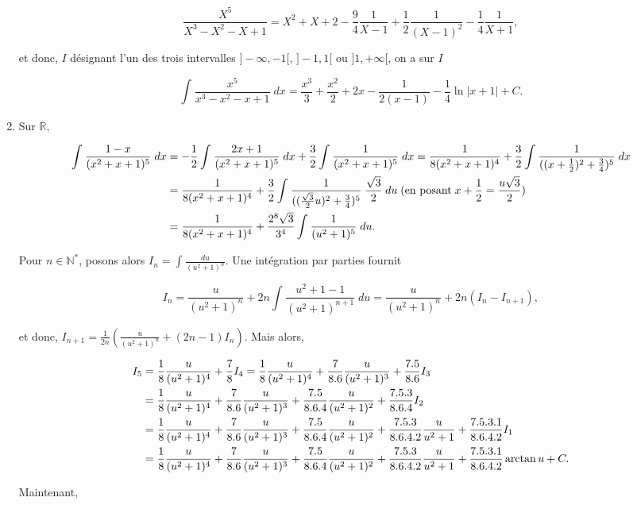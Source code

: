\documentclass[11pt,a4paper]{article}
\newcommand{\Nn}{\mathbb{N}} \newcommand{\N}{\mathbb{N}}
\newcommand{\Rr}{\mathbb{R}} \newcommand{\R}{\mathbb{R}}
\newcommand{\Arctan}{\mathop{\mathrm{arctan}}\nolimits}
\begin{document}
\begin{enumerate}
$$\frac{X^5}{X^3-X^2-X+1}=X^2+X+2-\frac{9}{4}\frac{1}{X-1}+\frac{1}{2}\frac{1}{(X-1)^2}-\frac{1}{4}\frac{1}{X+1},$$

et donc, $I$ désignant l'un des trois intervalles $]-\infty,-1[$, $]-1,1[$ ou $]1,+\infty[$, on a sur $I$

$$\int_{}^{}\frac{x^5}{x^3-x^2-x+1}\;dx=\frac{x^3}{3}+\frac{x^2}{2}+2x-\frac{1}{2(x-1)}-\frac{1}{4}\ln|x+1|+C.$$
\item  Sur $\Rr$,

\begin{align*}\ensuremath
\int_{}^{}\frac{1-x}{(x^2+x+1)^5}\;dx&=-\frac{1}{2}\int_{}^{}\frac{2x+1}{(x^2+x+1)^5}\;dx+\frac{3}{2}\int_{}^{}\frac{1}{(x^2+x+1)^5}\;dx
=\frac{1}{8(x^2+x+1)^4}+\frac{3}{2}\int_{}^{}\frac{1}{((x+\frac{1}{2})^2+\frac{3}{4})^5}\;dx\\
 &=\frac{1}{8(x^2+x+1)^4}+\frac{3}{2}\int_{}^{}\frac{1}{((\frac{\sqrt{3}}{2}u)^2+\frac{3}{4})^5}\;\frac{\sqrt{3}}{2}\;du\;(\mbox{en posant}\;x+\frac{1}{2}=\frac{u\sqrt{3}}{2})\\
 &=\frac{1}{8(x^2+x+1)^4}+\frac{2^8\sqrt{3}}{3^4}\int_{}^{}\frac{1}{(u^2+1)^5}\;du.
\end{align*}

Pour $n\in\Nn^*$, posons alors $I_n=\int_{}^{}\frac{du}{(u^2+1)^n}$. Une intégration par parties fournit

$$I_n=\frac{u}{(u^2+1)^n}+2n\int_{}^{}\frac{u^2+1-1}{(u^2+1)^{n+1}}\;du=\frac{u}{(u^2+1)^n}+2n(I_n-I_{n+1}),$$

et donc, $I_{n+1}=\frac{1}{2n}\left(\frac{u}{(u^2+1)^n}+(2n-1)I_n\right)$. Mais alors,

\begin{align*}\ensuremath
I_5&=\frac{1}{8}\frac{u}{(u^2+1)^4}+\frac{7}{8}I_4=\frac{1}{8}\frac{u}{(u^2+1)^4}+\frac{7}{8.6}\frac{u}{(u^2+1)^3}+\frac{7.5}{8.6}I_3\\
 &=\frac{1}{8}\frac{u}{(u^2+1)^4}+\frac{7}{8.6}\frac{u}{(u^2+1)^3}+\frac{7.5}{8.6.4}\frac{u}{(u^2+1)^2}+\frac{7.5.3}{8.6.4}I_2\\
 &=\frac{1}{8}\frac{u}{(u^2+1)^4}+\frac{7}{8.6}\frac{u}{(u^2+1)^3}+\frac{7.5}{8.6.4}\frac{u}{(u^2+1)^2}+\frac{7.5.3}{8.6.4.2}\frac{u}{u^2+1}+\frac{7.5.3.1}{8.6.4.2}I_1\\
 &=\frac{1}{8}\frac{u}{(u^2+1)^4}+\frac{7}{8.6}\frac{u}{(u^2+1)^3}+\frac{7.5}{8.6.4}\frac{u}{(u^2+1)^2}+\frac{7.5.3}{8.6.4.2}\frac{u}{u^2+1}+\frac{7.5.3.1}{8.6.4.2}\Arctan u+C.
\end{align*}

Maintenant,


\end{enumerate}
\end{document}
